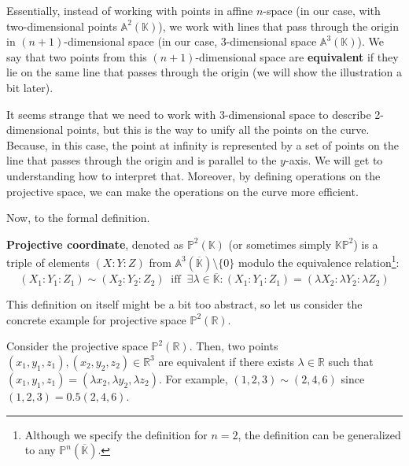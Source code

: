 \documentclass[../lecture-notes.tex]{subfiles}
\begin{document}
Essentially, instead of working with points in affine $n$-space (in our case, with two-dimensional points $\mathbb{A}^2(\mathbb{K})$), we work with lines that pass through the origin in 
$(n+1)$-dimensional space (in our case, 3-dimensional space $\mathbb{A}^3(\mathbb{K})$). We say that two points from this $(n+1)$-dimensional space are \textbf{equivalent} if they lie on the same line that passes through the origin (we will show the illustration a bit later). 

It seems strange that we need to work with 3-dimensional space to describe 2-dimensional points, but this is the way to unify all the points on the curve. Because, in this case, the point at infinity is represented by a set of points on the line that passes through the origin and is parallel to the
$y$-axis. We will get to understanding how to interpret that. Moreover, by defining operations on the projective space, we can make the operations on the curve more efficient.

Now, to the formal definition.

\begin{definition}
    \textbf{Projective coordinate}, denoted as $\mathbb{P}^2(\mathbb{K})$ (or sometimes simply $\mathbb{K}\mathbb{P}^2$) is a triple of elements $(X:Y:Z)$ from $\mathbb{A}^3(\overline{\mathbb{K}}) \setminus \{0\}$ modulo the equivalence relation\footnote{Although we specify the definition for $n=2$, the definition can be generalized to any $\mathbb{P}^n(\overline{\mathbb{K}})$.}:
    \begin{equation}
        (X_1:Y_1:Z_1) \sim (X_2:Y_2:Z_2) \;\; \text{iff} \;\; \exists \lambda \in \overline{\mathbb{K}}: (X_1:Y_1:Z_1) = (\lambda X_2: \lambda Y_2: \lambda Z_2)
    \end{equation}
\end{definition}

This definition on itself might be a bit too abstract, so let us consider the concrete example for projective space $\mathbb{P}^2(\mathbb{R})$.

\begin{example}
    Consider the projective space $\mathbb{P}^2(\mathbb{R})$. Then, two points $(x_1,y_1,z_1),(x_2,y_2,z_2) \in \mathbb{R}^3$ are equivalent if there exists $\lambda \in \mathbb{R}$ such that $(x_1,y_1,z_1) = (\lambda x_2, \lambda y_2, \lambda z_2)$. For example, $(1,2,3) \sim (2,4,6)$ since $(1,2,3) = 0.5(2,4,6)$.
\end{example}
\end{document}
